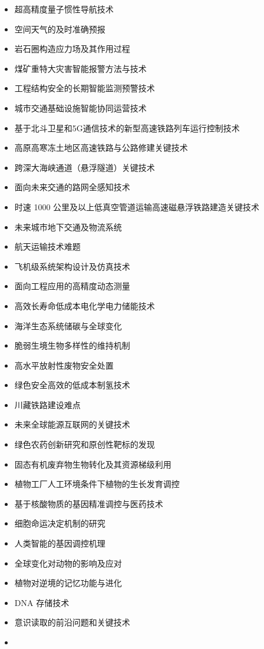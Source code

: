 \documentclass[]{tufte-book}
\providecommand{\tightlist}{%
  \setlength{\itemsep}{0pt}\setlength{\parskip}{0pt}}
\begin{document}
\begin{itemize}
\tightlist
\item
  超高精度量子惯性导航技术
\item
  空间天气的及时准确预报
\item
  岩石圈构造应力场及其作用过程
\item
  煤矿重特大灾害智能报警方法与技术
\item
  工程结构安全的长期智能监测预警技术
\item
  城市交通基础设施智能协同运营技术
\item
  基于北斗卫星和5G通信技术的新型高速铁路列车运行控制技术
\item
  高原高寒冻土地区高速铁路与公路修建关键技术
\item
  跨深大海峡通道（悬浮隧道）关键技术
\item
  面向未来交通的路网全感知技术
\item
  时速 1000 公里及以上低真空管道运输高速磁悬浮铁路建造关键技术
\item
  未来城市地下交通及物流系统
\item
  航天运输技术难题
\item
  飞机级系统架构设计及仿真技术
\item
  面向工程应用的高精度动态测量
\item
  高效长寿命低成本电化学电力储能技术
\item
  海洋生态系统储碳与全球变化
\item
  脆弱生境生物多样性的维持机制
\item
  高水平放射性废物安全处置
\item
  绿色安全高效的低成本制氢技术
\item
  川藏铁路建设难点
\item
  未来全球能源互联网的关键技术
\item
  绿色农药创新研究和原创性靶标的发现
\item
  固态有机废弃物生物转化及其资源梯级利用
\item
  植物工厂人工环境条件下植物的生长发育调控
\item
  基于核酸物质的基因精准调控与医药技术
\item
  细胞命运决定机制的研究
\item
  人类智能的基因调控机理
\item
  全球变化对动物的影响及应对
\item
  植物对逆境的记忆功能与进化
\item
  DNA 存储技术
\item
  意识读取的前沿问题和关键技术
\item

\end{itemize}
\end{document}

